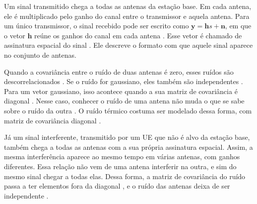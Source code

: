 
Um sinal transmitido chega a todas as antenas da estação base. Em cada antena, ele é multiplicado pelo ganho do canal entre o transmissor e aquela antena. Para um único transmissor, o sinal recebido pode ser escrito como $\mathbf{y}=\mathbf{h}s+\mathbf{n}$, em que o vetor $\mathbf{h}$ reúne os ganhos do canal em cada antena \cite[p.~297]{tse-viswanath}. Esse vetor é chamado de assinatura espacial do sinal \cite[p.~297]{tse-viswanath}. Ele descreve o formato com que aquele sinal aparece no conjunto de antenas.



Quando a covariância entre o ruído de duas antenas é zero, esses ruídos são descorrelacionados \cite[p.~202]{haykin-sistemas}. Se o ruído for gaussiano, eles também são independentes \cite[p.~222]{haykin-sistemas}. Para um vetor gaussiano, isso acontece quando a sua matriz de covariância é diagonal \cite[p.~499]{tse-viswanath}. Nesse caso, conhecer o ruído de uma antena não muda o que se sabe sobre o ruído da outra \cite[p.~196]{haykin-sistemas}. O ruído térmico costuma ser modelado dessa forma, com matriz de covariância diagonal \cite{zhao-lmmse}.

Já um sinal interferente, transmitido por um UE que não é alvo da estação base, também chega a todas as antenas com a sua própria assinatura espacial. Assim, a mesma interferência aparece ao mesmo tempo em várias antenas, com ganhos diferentes. Essa relação não vem de uma antena interferir na outra, e sim do mesmo sinal chegar a todas elas. Dessa forma, a matriz de covariância do ruído passa a ter elementos fora da diagonal \cite[p.~360]{tse-viswanath}, e o ruído das antenas deixa de ser independente \cite[p.~202]{haykin-sistemas}.



